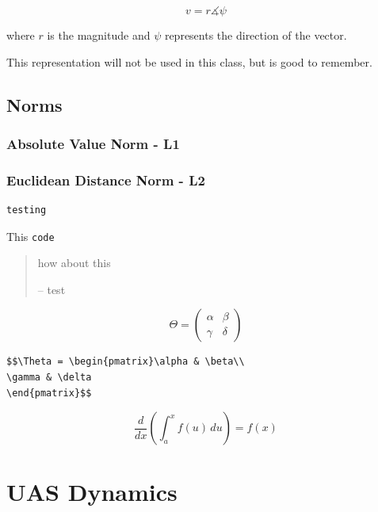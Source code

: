 \documentclass[
]{book}
\theoremstyle{definition}
\theoremstyle{definition}
\theoremstyle{definition}
\theoremstyle{definition}
\theoremstyle{remark}
\begin{document}
\[v = r\measuredangle \psi\]

where \(r\) is the magnitude and \(\psi\) represents the direction of the vector.

This representation will not be used in this class, but is good to remember.

\hypertarget{norms}{%
\section{Norms}\label{norms}}

\hypertarget{absolute-value-norm---l1}{%
\subsection{Absolute Value Norm - L1}\label{absolute-value-norm---l1}}

\hypertarget{euclidean-distance-norm---l2}{%
\subsection{Euclidean Distance Norm - L2}\label{euclidean-distance-norm---l2}}

\begin{verbatim}
testing
\end{verbatim}

This \texttt{code}

\begin{quote}
how about this

-- test
\end{quote}

\[\Theta = \begin{pmatrix}\alpha & \beta\\
\gamma & \delta
\end{pmatrix}\]

\begin{verbatim}
$$\Theta = \begin{pmatrix}\alpha & \beta\\
\gamma & \delta
\end{pmatrix}$$
\end{verbatim}

\begin{equation*} 
\frac{d}{dx}\left( \int_{a}^{x} f(u)\,du\right)=f(x)
\end{equation*}

\hypertarget{uas-dynamics}{%
\chapter{UAS Dynamics}\label{uas-dynamics}}
\end{document}
